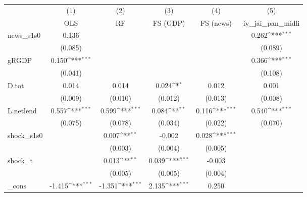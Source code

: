 {
\def\sym#1{\ifmmode^{#1}\else\(^{#1}\)\fi}
\begin{tabular}{l*{5}{c}}
\toprule
            &\multicolumn{1}{c}{(1)}&\multicolumn{1}{c}{(2)}&\multicolumn{1}{c}{(3)}&\multicolumn{1}{c}{(4)}&\multicolumn{1}{c}{(5)}\\
            &\multicolumn{1}{c}{OLS}&\multicolumn{1}{c}{RF}&\multicolumn{1}{c}{FS (GDP)}&\multicolumn{1}{c}{FS (news)}&\multicolumn{1}{c}{iv\_jai\_pan\_midli}\\
\midrule
news\_s1s0   &       0.136         &                     &                     &                     &       0.262\sym{***}\\
            &     (0.085)         &                     &                     &                     &     (0.089)         \\
\addlinespace
gRGDP       &       0.150\sym{***}&                     &                     &                     &       0.366\sym{***}\\
            &     (0.041)         &                     &                     &                     &     (0.108)         \\
\addlinespace
D.tot       &       0.014         &       0.014         &       0.024\sym{*}  &       0.012         &       0.001         \\
            &     (0.009)         &     (0.010)         &     (0.012)         &     (0.013)         &     (0.008)         \\
\addlinespace
L.netlend   &       0.557\sym{***}&       0.599\sym{***}&       0.084\sym{**} &       0.116\sym{***}&       0.540\sym{***}\\
            &     (0.075)         &     (0.078)         &     (0.034)         &     (0.022)         &     (0.070)         \\
\addlinespace
shock\_s1s0  &                     &       0.007\sym{**} &      -0.002         &       0.028\sym{***}&                     \\
            &                     &     (0.003)         &     (0.004)         &     (0.005)         &                     \\
\addlinespace
shock\_t     &                     &       0.013\sym{**} &       0.039\sym{***}&      -0.003         &                     \\
            &                     &     (0.005)         &     (0.005)         &     (0.004)         &                     \\
\addlinespace
\_cons      &      -1.415\sym{***}&      -1.351\sym{***}&       2.135\sym{***}&       0.250         &                     \\

\end{tabular}}
